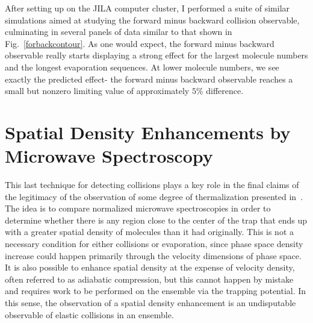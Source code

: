 After setting up on the JILA computer cluster, I performed a suite of similar simulations aimed at studying the forward minus backward collision observable, culminating in several panels of data similar to that shown in Fig.~\ref{forbackcontour}.
As one would expect, the forward minus backward observable really starts displaying a strong effect for the largest molecule numbers and the longest evaporation sequences.
At lower molecule numbers, we see exactly the predicted effect- the forward minus backward observable reaches a small but nonzero limiting value of approximately $5\%$ difference.

\section{Spatial Density Enhancements by Microwave Spectroscopy}

This last technique for detecting collisions plays a key role in the final claims of the legitimacy of the observation of some degree of thermalization presented in~\citep[App.~B]{Reens2017}.
The idea is to compare normalized microwave spectroscopies in order to determine whether there is any region close to the center of the trap that ends up with a greater spatial density of molecules than it had originally.
This is not a necessary condition for either collisions or evaporation, since phase space density increase could happen primarily through the velocity dimensions of phase space.
It is also possible to enhance spatial density at the expense of velocity density, often referred to as adiabatic compression, but this cannot happen by mistake and requires work to be performed on the ensemble via the trapping potential.
In this sense, the observation of a spatial density enhancement is an undisputable observable of elastic collisions in an ensemble.

